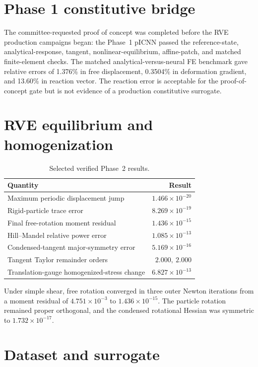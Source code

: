 \section{Phase 1 constitutive bridge}

The committee-requested proof of concept was completed before the RVE
production campaigns began: the Phase~1 pICNN passed the reference-state,
analytical-response, tangent, nonlinear-equilibrium, affine-patch, and
matched finite-element checks. The matched
analytical-versus-neural FE benchmark gave relative errors of
1.376\% in free displacement,
0.3504\% in deformation gradient, and
13.60\% in reaction vector. The reaction error is acceptable
for the proof-of-concept gate but is not evidence of a production constitutive
surrogate.

\section{RVE equilibrium and homogenization}

\begin{table}[H]
\centering
\caption{Selected verified Phase~2 results.}
\label{tab:p2-results}
\begin{tabular}{@{}lr@{}}
\toprule
Quantity & Result\\
\midrule
Maximum periodic displacement jump & \(1.466\times10^{-20}\)\\
Rigid-particle trace error & \(8.269\times10^{-19}\)\\
Final free-rotation moment residual & \(1.436\times10^{-15}\)\\
Hill--Mandel relative power error & \(1.085\times10^{-13}\)\\
Condensed-tangent major-symmetry error & \(5.169\times10^{-16}\)\\
Tangent Taylor remainder orders & \(2.000,\ 2.000\)\\
Translation-gauge homogenized-stress change & \(6.827\times10^{-13}\)\\
\bottomrule
\end{tabular}
\end{table}

Under simple shear, free rotation converged in three outer Newton iterations
from a moment residual of \(4.751\times10^{-3}\) to
\(1.436\times10^{-15}\). The particle rotation remained proper orthogonal,
and the condensed rotational Hessian was symmetric to
\(1.732\times10^{-17}\).

\section{Dataset and surrogate}

